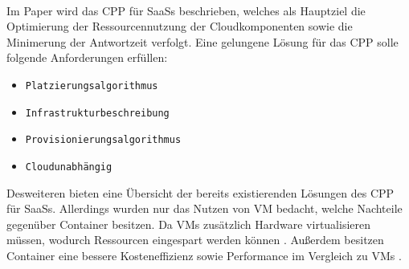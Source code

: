 \paragraph{}
Im Paper \cite{Bousselmi2014} wird das \ac{CPP} für SaaSs beschrieben, welches als Hauptziel die Optimierung der Ressourcennutzung
der Cloudkomponenten sowie die Minimerung der Antwortzeit verfolgt.
Eine gelungene Lösung für das \ac{CPP} solle folgende Anforderungen erfüllen:
\begin{itemize}
  \item \texttt{Platzierungsalgorithmus}
  \item \texttt{Infrastrukturbeschreibung}
  \item \texttt{Provisionierungsalgorithmus}
  \item \texttt{Cloudunabhängig}
\end{itemize}
Desweiteren bieten \citeauthor{Bousselmi2014} eine Übersicht der bereits existierenden Lösungen des \ac{CPP} für \acp{SaaS}.
Allerdings wurden nur das Nutzen von \acf{VM} bedacht, welche Nachteile gegenüber Container besitzen.
Da \acp{VM} zusätzlich Hardware virtualisieren müssen, wodurch Ressourcen eingespart werden können \cite{seo2014performance}.
Außerdem besitzen Container eine bessere Kosteneffizienz sowie Performance im Vergleich zu \acp{VM} \cite{soltesz2007container}.